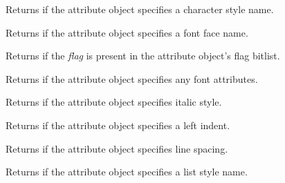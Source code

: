 \label{wxrichtextattrhascharacterstylename}


Returns \true if the attribute object specifies a character style name.

\label{wxrichtextattrhasfacename}


Returns \true if the attribute object specifies a font face name.

\label{wxrichtextattrhasflag}


Returns \true if the {\it flag} is present in the attribute object's flag bitlist.

\label{wxrichtextattrhasfont}


Returns \true if the attribute object specifies any font attributes.

\label{wxrichtextattrhasitalic}


Returns \true if the attribute object specifies italic style.

\label{wxrichtextattrhasleftindent}


Returns \true if the attribute object specifies a left indent.

\label{wxrichtextattrhaslinespacing}


Returns \true if the attribute object specifies line spacing.

\label{wxrichtextattrhasliststylename}


Returns \true if the attribute object specifies a list style name.

\label{wxrichtextattrhasparagraphspacingafter}

